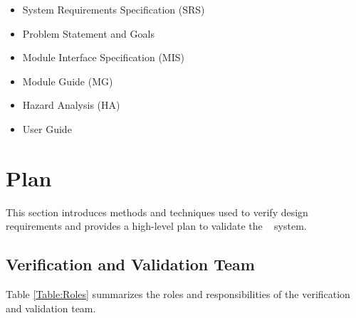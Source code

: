 \documentclass[12pt, titlepage]{article}
\begin{document}
\begin{itemize}
	\item System Requirements Specification (SRS) \cite{SRS}
	\item Problem Statement and Goals \cite{PSG}
	\item Module Interface Specification (MIS) \cite{MIS}
	\item Module Guide (MG) \cite{MG}
	\item Hazard Analysis (HA) \cite{FMEA}
	\item User Guide \cite{UG}
\end{itemize}

\section{Plan} \label{Plan}


This section introduces methods and techniques used to verify design requirements and provides a high-level plan to validate the \progname~ system. 

\subsection{Verification and Validation Team}

  
\noindent Table \ref{Table:Roles} summarizes the roles and responsibilities of the verification and validation team.
  
\end{document}
